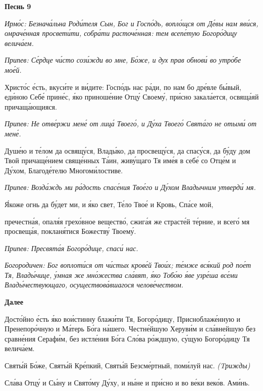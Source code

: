  

\bfseries Песнь 9\normalfont{}


 \itshape Ирмо́с:\normalfont{} Безнача́льна Роди́теля Сын, Бог и Госпо́дь, вопло́щся от Де́вы нам
яви́ся, омраче́нная просвети́ти, собра́ти расточе́нная: тем всепе́тую Богоро́дицу
велича́ем.


 \itshape Припев:\normalfont{} Се́рдце чи́сто сози́жди во мне, Бо́же, и дух прав обнови́ во утро́бе
мое́й.


   Христо́с е́сть, вкуси́те и ви́дите: Госпо́дь нас ра́ди, по нам бо дре́вле
бы́вый, еди́ною Себе́ прине́с, я́ко приноше́ние Отцу́ Своему́, при́сно
закала́ется, освяща́яй причаща́ющияся.


 \itshape Припев:\normalfont{} Не отве́ржи мене́ от лица́ Твоего́, и Ду́ха Твоего́ Свята́го не отыми́ от
мене́.


   Душе́ю и те́лом да освящу́ся, Влады́ко, да просвещу́ся, да спасу́ся, да
бу́ду дом Твой причаще́нием свяще́нных Та́ин, живу́щаго Тя име́я в себе́ со
Отце́м и Ду́хом, Благоде́телю Многоми́лостиве.


 \itshape Припев:\normalfont{} Возда́ждь ми ра́дость спасе́ния Твое́го и Ду́хом Владычним утверди́
мя.


   Я́коже огнь да бу́дет ми, и я́ко свет, Те́ло Твое́ и Кровь, Спа́се мой,

пречестна́я, опаля́я грехо́вное вещество́, сжига́я же страсте́й те́рние, и всего́
мя просвеща́я, покланя́тися Божеству́ Твоему́.


 \itshape Припев:\normalfont{} Пресвята́я Богоро́дице, спаси́ нас.


 \itshape Богородичен:\normalfont{} Бог воплоти́ся от чи́стых крове́й Твои́х; те́мже вся́кий род
пое́т Тя, Влады́чице, у́мная же мно́жества сла́вят, я́ко Тобо́ю я́ве узре́ша
все́ми Влады́чествующаго, осуществова́вшагося челове́чеством.



 

\bfseries Далее\normalfont{}


   Досто́йно е́сть я́ко вои́стинну блажи́ти Тя, Богоро́дицу, Присноблаже́нную и
Пренепоро́чную и Ма́терь Бо́га на́шего. Честне́йшую Херуви́м и сла́внейшую
без сравне́ния Серафи́м, без истле́ния Бо́га Сло́ва ро́ждшую, су́щую
Богоро́дицу Тя велича́ем.


   Святы́й Бо́же, Святы́й Кре́пкий, Святы́й Безсме́ртный, поми́луй нас.
\itshape (Tрижды)\normalfont{}


   Сла́ва Отцу́ и Сы́ну и Свято́му Ду́ху, и ны́не и при́сно и во ве́ки веко́в.
Ами́нь.


